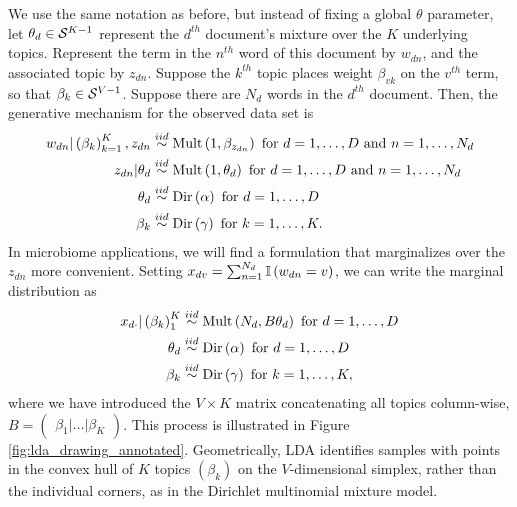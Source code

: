 We use the same notation as before, but instead of fixing a global $\theta$
parameter, let $\theta_{d} \in \mathcal{S}^{K - 1}$ represent the $d^{th}$
document's mixture over the $K$ underlying topics. Represent the term in the
$n^{th}$ word of this document by $w_{dn}$, and the associated topic by
$z_{dn}$. Suppose the $k^{th}$ topic places weight $\beta_{vk}$ on the $v^{th}$
term, so that $\beta_{k} \in \mathcal{S}^{V - 1}$. Suppose there are $N_{d}$ words
in the $d^{th}$ document. Then, the generative mechanism for the observed data
set is
\begin{align*}
w_{dn} \vert \left(\beta_{k}\right)_{k = 1}^{K}, z_{dn} &\overset{iid}{\sim} \textnormal{Mult}\left(1, \beta_{z_{dn}}\right) \text{ for } d = 1, \dots, D  \text{ and } n = 1, \dots,  N_{d} \\
z_{dn} \vert \theta_{d} &\overset{iid}{\sim} \textnormal{Mult}\left(1, \theta_{d}\right) \text{ for } d = 1, \dots, D \text{ and } n = 1, \dots, N_{d}\\
\theta_{d} &\overset{iid}{\sim} \textnormal{Dir}\left(\alpha\right) \text{ for } d = 1, \dots, D \\
\beta_{k} &\overset{iid}{\sim} \textnormal{Dir}\left(\gamma\right) \text{ for } k = 1, \dots, K.
\end{align*}
In microbiome applications, we will find a formulation that marginalizes over
the $z_{dn}$ more convenient. Setting $x_{dv} = \sum_{n = 1}^{N_{d}}
\mathbb{I}\left({w_{dn} = v}\right)$, we can write the marginal distribution as
\begin{align}
x_{d\cdot} \vert \left(\beta_{k}\right)_{1}^{K} &\overset{iid}{\sim} \textnormal{Mult}\left(N_{d}, B\theta_{d}\right) \text{ for } d = 1, \dots, D \label{eq:lda_counts_generative}\\
\theta_{d} &\overset{iid}{\sim} \textnormal{Dir}\left(\alpha\right) \text{ for } d = 1, \dots, D \nonumber \\
\beta_{k} &\overset{iid}{\sim} \textnormal{Dir}\left(\gamma\right) \text{ for }k = 1, \dots, K, \nonumber
\end{align}
where we have introduced the $V \times K$ matrix concatenating all topics
column-wise, $B = \begin{pmatrix}\beta_{1}\vert \dots\vert \beta_{K}\end{pmatrix}$. This
process is illustrated in Figure \ref{fig:lda_drawing_annotated}. Geometrically,
LDA identifies samples with points in the convex hull of $K$ topics
$\left(\beta_{k}\right)$ on the $V$-dimensional simplex, rather than the
individual corners, as in the Dirichlet multinomial mixture model.

